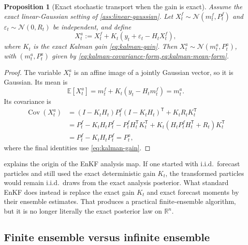 \documentclass[11pt]{article}
\newcommand{\R}{\mathbb{R}}
\newcommand{\E}{\mathbb{E}}
\newcommand{\Cov}{\operatorname{Cov}}
\newcommand{\Id}{I}
\newcommand{\parens}[1]{\left( #1 \right)}
\newcommand{\transpose}{^{\mathsf T}}
\numberwithin{equation}{section}
\theoremstyle{plain}
\newtheorem{proposition}[theorem]{Proposition}
\theoremstyle{definition}
\theoremstyle{remark}
\begin{document}
\begin{proposition}[Exact stochastic transport when the gain is exact]
\label{prop:exact-stochastic-transport}
Assume the exact linear-Gaussian setting of \cref{ass:linear-gaussian}. Let $X_t^f\sim\mathcal N(m_t^f,P_t^f)$ and $\varepsilon_t\sim\mathcal N(0,R_t)$ be independent, and define
\begin{equation}
X_t^a := X_t^f + K_t\parens{y_t+\varepsilon_t-H_tX_t^f},
\end{equation}
where $K_t$ is the exact Kalman gain \cref{eq:kalman-gain}. Then $X_t^a\sim \mathcal N(m_t^a,P_t^a)$, with $(m_t^a,P_t^a)$ given by \cref{eq:kalman-covariance-form,eq:kalman-mean-form}.
\end{proposition}

\begin{proof}
The variable $X_t^a$ is an affine image of a jointly Gaussian vector, so it is Gaussian. Its mean is
\[
\E[X_t^a]
=
m_t^f + K_t(y_t-H_tm_t^f)
=
m_t^a.
\]
Its covariance is
\begin{align*}
\Cov(X_t^a)
&=
\parens{\Id-K_tH_t}P_t^f\parens{\Id-K_tH_t}\transpose
+K_tR_tK_t\transpose \\
&=
P_t^f-K_tH_tP_t^f-P_t^fH_t\transpose K_t\transpose
+K_t\parens{H_tP_t^fH_t\transpose+R_t}K_t\transpose \\
&=
P_t^f-K_tH_tP_t^f
=
P_t^a,
\end{align*}
where the final identities use \cref{eq:kalman-gain}.
\end{proof}

 explains the origin of the EnKF analysis map. If one started with i.i.d.\ forecast particles and still used the exact deterministic gain $K_t$, the transformed particles would remain i.i.d.\ draws from the exact analysis posterior. What standard EnKF does instead is replace the exact gain $K_t$ and exact forecast moments by their ensemble estimates. That produces a practical finite-ensemble algorithm, but it is no longer literally the exact posterior law on $\R^n$.

\subsection{Finite ensemble versus infinite ensemble}
\end{document}
